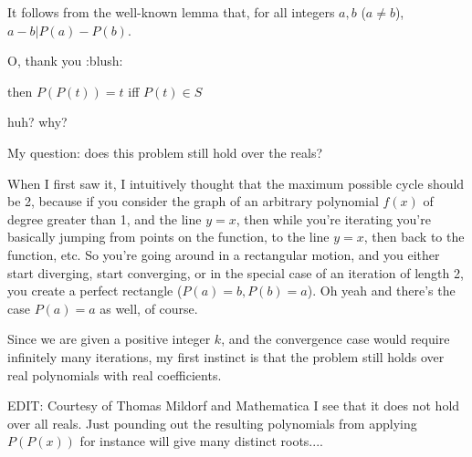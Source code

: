 \begin{solution}
	It follows from the well-known lemma that, for all integers $a, b$ ($a \neq b$), $a-b | P(a)-P(b)$.
\end{solution}



\begin{solution}
	O, thank you  :blush:
\end{solution}



\begin{solution}
	\begin{tcolorbox} then $P(P(t))=t$ iff $P(t)\in S$\end{tcolorbox}

huh? why?
\end{solution}






\begin{solution}
	My question: does this problem still hold over the reals? 

When I first saw it, I intuitively thought that the maximum possible cycle should be 2, because if you consider the graph of an arbitrary polynomial $f(x)$ of degree greater than 1, and the line $y = x$, then while you're iterating you're basically jumping from points on the function, to the line $y = x$, then back to the function, etc. So you're going around in a rectangular motion, and you either start diverging, start converging, or in the special case of an iteration of length 2, you create a perfect rectangle ($P(a) = b, P(b) = a$). Oh yeah and there's the case $P(a) = a$ as well, of course.

Since we are given a positive integer $k$, and the convergence case would require infinitely many iterations, my first instinct is that the problem still holds over real polynomials with real coefficients.

EDIT: Courtesy of Thomas Mildorf and Mathematica I see that it does not hold over all reals. Just pounding out the resulting polynomials from applying $P(P(x))$ for instance will give many distinct roots....
\end{solution}



